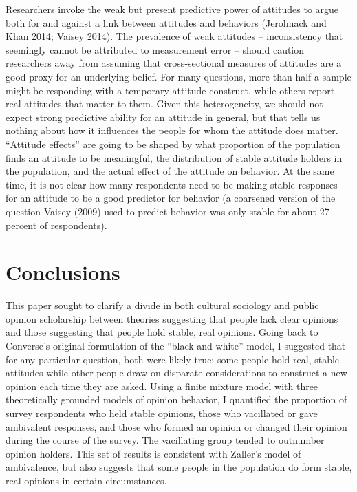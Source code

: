 \documentclass[12pt,]{article}
\begin{document}
Researchers invoke the weak but present predictive power of attitudes to argue both for and against a link between attitudes and behaviors (Jerolmack and Khan 2014; Vaisey 2014). The prevalence of weak attitudes -- inconsistency that seemingly cannot be attributed to measurement error -- should caution researchers away from assuming that cross-sectional measures of attitudes are a good proxy for an underlying belief. For many questions, more than half a sample might be responding with a temporary attitude construct, while others report real attitudes that matter to them. Given this heterogeneity, we should not expect strong predictive ability for an attitude in general, but that tells us nothing about how it influences the people for whom the attitude does matter. ``Attitude effects'' are going to be shaped by what proportion of the population finds an attitude to be meaningful, the distribution of stable attitude holders in the population, and the actual effect of the attitude on behavior. At the same time, it is not clear how many respondents need to be making stable responses for an attitude to be a good predictor for behavior (a coarsened version of the question Vaisey (2009) used to predict behavior was only stable for about 27 percent of respondents).

\hypertarget{conclusions}{%
\section{Conclusions}\label{conclusions}}

This paper sought to clarify a divide in both cultural sociology and public opinion scholarship between theories suggesting that people lack clear opinions and those suggesting that people hold stable, real opinions. Going back to Converse's original formulation of the ``black and white'' model, I suggested that for any particular question, both were likely true: some people hold real, stable attitudes while other people draw on disparate considerations to construct a new opinion each time they are asked. Using a finite mixture model with three theoretically grounded models of opinion behavior, I quantified the proportion of survey respondents who held stable opinions, those who vacillated or gave ambivalent responses, and those who formed an opinion or changed their opinion during the course of the survey. The vacillating group tended to outnumber opinion holders. This set of results is consistent with Zaller's model of ambivalence, but also suggests that some people in the population do form stable, real opinions in certain circumstances.
\end{document}
